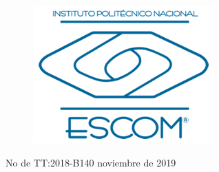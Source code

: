 \documentclass[12pt]{report}
\begin{document}
\begin{figure}[H]
	\hspace{.85cm}
	\begin{minipage}[p]{0.20\linewidth}
		\centering
		\includegraphics[width=\linewidth]{images/logoESCOM}
	\end{minipage}
\end{figure}

\begin{normalsize}
No de TT:2018-B140 \hspace{10cm} noviembre de 2019
\end{normalsize}
\end{document}
